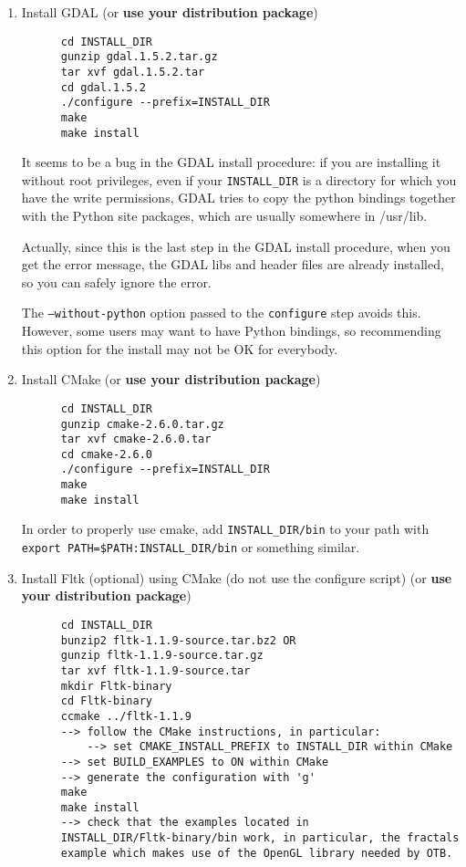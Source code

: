 \begin{enumerate}

\item Install GDAL (or \textbf{use your distribution package})
  \begin{verbatim}
      cd INSTALL_DIR
      gunzip gdal.1.5.2.tar.gz
      tar xvf gdal.1.5.2.tar
      cd gdal.1.5.2
      ./configure --prefix=INSTALL_DIR
      make
      make install
  \end{verbatim}

It seems to be a bug in the GDAL install procedure: if you are installing it without root privileges, even if your \texttt{INSTALL\_DIR} is a directory for which you have the write permissions, GDAL tries to copy the python bindings together with the Python site packages, which are usually somewhere in /usr/lib.

Actually, since this is the last step in the GDAL install procedure, when you get the error message, the GDAL libs and header files are already installed, so you can safely ignore the error.

The \texttt{--without-python} option passed to the \texttt{configure} step avoids this. However, some users may want to have Python bindings, so recommending this option for the install may not be OK for everybody.

\item Install CMake (or \textbf{use your distribution package})
  \begin{verbatim}
      cd INSTALL_DIR
      gunzip cmake-2.6.0.tar.gz
      tar xvf cmake-2.6.0.tar
      cd cmake-2.6.0
      ./configure --prefix=INSTALL_DIR
      make
      make install
  \end{verbatim}
      In order to properly use cmake, add \texttt{INSTALL\_DIR/bin} to
      your path with \texttt{export PATH=\$PATH:INSTALL\_DIR/bin} or
      something similar.

\item Install Fltk (optional) using CMake (do not use the configure script) (or \textbf{use your distribution package})
  \begin{verbatim}
      cd INSTALL_DIR
      bunzip2 fltk-1.1.9-source.tar.bz2 OR
      gunzip fltk-1.1.9-source.tar.gz
      tar xvf fltk-1.1.9-source.tar
      mkdir Fltk-binary
      cd Fltk-binary
      ccmake ../fltk-1.1.9
      --> follow the CMake instructions, in particular:
          --> set CMAKE_INSTALL_PREFIX to INSTALL_DIR within CMake
	  --> set BUILD_EXAMPLES to ON within CMake
	  --> generate the configuration with 'g'
      make
      make install
      --> check that the examples located in
      INSTALL_DIR/Fltk-binary/bin work, in particular, the fractals
      example which makes use of the OpenGL library needed by OTB.
  \end{verbatim}


\end{enumerate}
